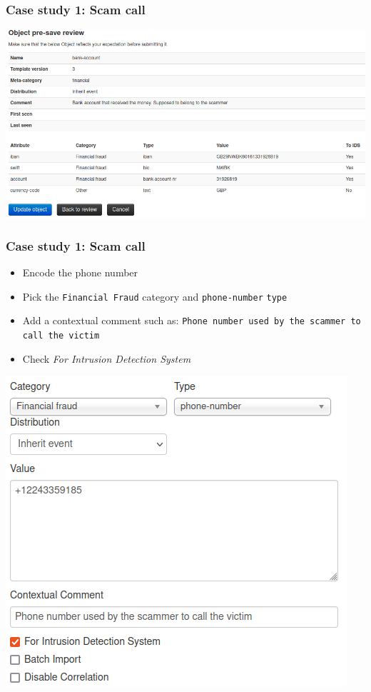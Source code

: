 \begin{frame}
    \frametitle{Case study 1: Scam call}
    \begin{center}
        \includegraphics[width=1.0\linewidth]{pictures/case1/object-bankaccount.png}
    \end{center}
\end{frame}

\begin{frame}
    \frametitle{Case study 1: Scam call}
    \begin{itemize}
        \item Encode the phone number
        \item Pick the \texttt{Financial Fraud} category and \texttt{phone-number} \texttt{type}
        \item Add a contextual comment such as: \texttt{Phone number used by the scammer to call the victim}
        \item Check \textit{For Intrusion Detection System}
    \end{itemize}
    \begin{center}
        \includegraphics[width=0.70\linewidth]{pictures/case1/attribute-phone.png}
    \end{center}
\end{frame}

